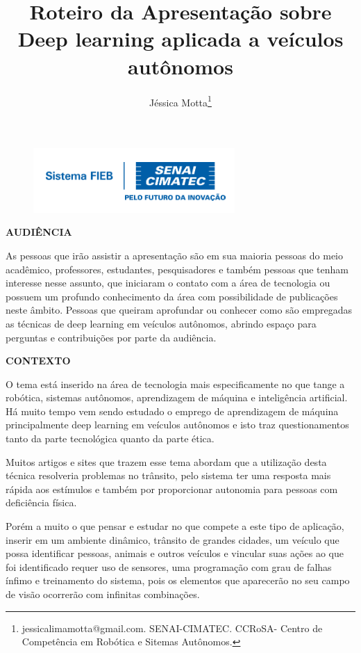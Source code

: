 \documentclass[12pt,a4paper]{article}
\begin{document}
 
\begin{figure}
    \flushright
    \includegraphics[scale=0.5]{Logo_senai.png}
\end{figure}

\title{Roteiro da Apresentação sobre Deep learning aplicada a veículos autônomos}
\author{Jéssica Motta\thanks{jessicalimamotta@gmail.com. SENAI-CIMATEC. CCRoSA- Centro de Competência em Robótica e Sitemas Autônomos.}}
 
 

    \maketitle
    \singlespacing


    \textbf{AUDIÊNCIA}

    \par As pessoas que irão assistir a apresentação são em sua maioria pessoas do meio acadêmico, professores, estudantes, pesquisadores e também pessoas que tenham interesse nesse assunto, que iniciaram o contato com a área de tecnologia ou possuem um profundo conhecimento da área com possibilidade de publicações neste âmbito. Pessoas que queiram aprofundar ou conhecer como são empregadas as técnicas de deep learning em veículos autônomos, abrindo espaço para perguntas e contribuições por parte da audiência.


    \textbf{CONTEXTO}
    \par O tema está inserido na área de tecnologia mais especificamente no que tange a robótica, sistemas autônomos, aprendizagem de máquina e inteligência artificial. Há muito tempo vem sendo estudado o emprego de aprendizagem de máquina principalmente deep learning em veículos autônomos e isto traz questionamentos tanto da parte tecnológica quanto da parte ética.
    \par Muitos artigos e sites que trazem esse tema abordam que a utilização desta técnica resolveria problemas no trânsito, pelo sistema ter uma resposta mais rápida aos estímulos e também por proporcionar autonomia para pessoas com deficiência física.
    \par Porém a muito o que pensar e estudar no que compete a este tipo de aplicação, inserir em um ambiente dinâmico, trânsito de grandes cidades, um veículo que possa identificar pessoas, animais e outros veículos e vincular suas ações ao que foi identificado requer uso de sensores, uma programação com grau de falhas ínfimo e treinamento do sistema, pois os elementos que aparecerão no seu campo de visão ocorrerão com infinitas combinações.
\end{document}
